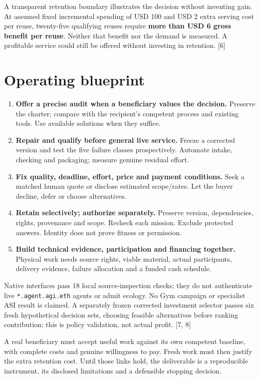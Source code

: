 \documentclass[10pt]{article}
\begin{document}
A transparent retention boundary illustrates the decision without inventing gain. At assumed fixed incremental spending of USD 100 and USD 2 extra serving cost per reuse, twenty-five qualifying reuses require \textbf{more than USD 6 gross benefit per reuse}. Neither that benefit nor the demand is measured. A profitable service could still be offered without investing in retention. [6]

\section*{Operating blueprint}
\begin{enumerate}
\item \textbf{Offer a precise audit when a beneficiary values the decision.} Preserve the charter; compare with the recipient's competent process and existing tools. Use available solutions when they suffice.
\item \textbf{Repair and qualify before general live service.} Freeze a corrected version and test the five failure classes prospectively. Automate intake, checking and packaging; measure genuine residual effort.
\item \textbf{Fix quality, deadline, effort, price and payment conditions.} Seek a matched human quote or disclose estimated scope/rates. Let the buyer decline, defer or choose alternatives.
\item \textbf{Retain selectively; authorize separately.} Preserve version, dependencies, rights, provenance and scope. Recheck each mission. Exclude protected answers. Identity does not prove fitness or permission.
\item \textbf{Build technical evidence, participation and financing together.} Physical work needs source rights, viable material, actual participants, delivery evidence, failure allocation and a funded cash schedule.
\end{enumerate}

Native interfaces pass 18 local source-inspection checks; they do not authenticate live \texttt{*.agent.agi.eth} agents or admit ecology. No Gym campaign or specialist ASI result is claimed. A separately frozen corrected investment selector passes six fresh hypothetical decision sets, choosing feasible alternatives before ranking contribution; this is policy validation, not actual profit. [7, 8]

\begin{finding}[title=Next decisive evidence]
A real beneficiary must accept useful work against its own competent baseline, with complete costs and genuine willingness to pay. Fresh work must then justify the extra retention cost. Until those links hold, the deliverable is a reproducible instrument, its disclosed limitations and a defensible stopping decision.
\end{finding}
\end{document}
